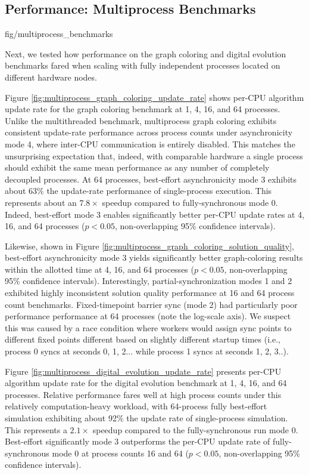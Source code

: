 \subsection{Performance: Multiprocess Benchmarks}
\label{sec:multiprocess-benchmarks}

{fig/multiprocess_benchmarks}

Next, we tested how performance on the graph coloring and digital evolution benchmarks fared when scaling with fully independent processes located on different hardware nodes.

Figure \ref{fig:multiprocess_graph_coloring_update_rate} shows per-CPU algorithm update rate for the graph coloring benchmark at 1, 4, 16, and 64 processes.
Unlike the multithreaded benchmark, multiprocess graph coloring exhibits consistent update-rate performance across process counts under asynchronicity mode 4, where inter-CPU communication is entirely disabled.
This matches the unsurprising expectation that, indeed, with comparable hardware a single process should exhibit the same mean performance as any number of completely decoupled processes.
At 64 processes, best-effort asynchronicity mode 3 exhibits about 63\% the update-rate performance of single-process execution.
This represents about an $7.8\times$ speedup compared to fully-synchronous mode 0.
Indeed, best-effort mode 3 enables significantly better per-CPU update rates at 4, 16, and 64 processes ($p < 0.05$, non-overlapping 95\% confidence intervals).

Likewise, shown in Figure \ref{fig:multiprocess_graph_coloring_solution_quality}, best-effort asynchronicity mode 3 yields significantly better graph-coloring results within the allotted time at 4, 16, and 64 processes ($p < 0.05$, non-overlapping 95\% confidence intervals).
Interestingly, partial-synchronization modes 1 and 2 exhibited highly inconsistent solution quality performance at 16 and 64 process count benchmarks.
Fixed-timepoint barrier sync (mode 2) had particularly poor performance performance at 64 processes (note the log-scale axis).
We suspect this was caused by a race condition where workers would assign sync points to different fixed points different based on slightly different startup times (i.e., process 0 syncs at seconds 0, 1, 2... while process 1 syncs at seconds 1, 2, 3..).

Figure \ref{fig:multiprocess_digital_evolution_update_rate} presents per-CPU algorithm update rate for the digital evolution benchmark at 1, 4, 16, and 64 processes.
Relative performance fares well at high process counts under this relatively computation-heavy workload, with 64-process fully best-effort simulation exhibiting about 92\% the update rate of single-process simulation.
This represents a $2.1\times$ speedup compared to the fully-synchronous run mode 0.
Best-effort significantly mode 3 outperforms the per-CPU update rate of fully-synchronous mode 0 at process counts 16 and 64 ($p < 0.05$, non-overlapping 95\% confidence intervals).
